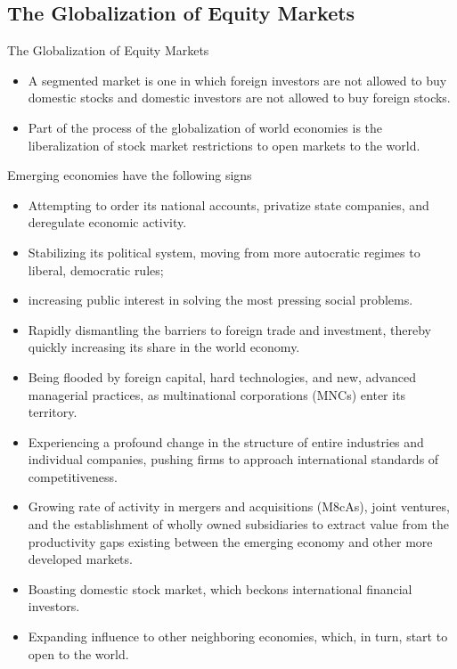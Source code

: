 \documentclass[international_finance_p2.tex]{subfiles}
\begin{document}
\subsection{The Globalization of Equity Markets}
\begin{frame}{The Globalization of Equity Markets}
\begin{itemize}[<+->]
\item
A segmented market is one in which foreign investors are not allowed to buy domestic stocks and domestic investors are not allowed to buy foreign stocks. 
\item
Part of the process of the globalization of world economies is the liberalization of stock market restrictions to open markets to the world.
\end{itemize}
\end{frame}
\begin{frame}[allowframebreaks]{Emerging economies have the following signs}
\begin{itemize}
\item
Attempting to order its national accounts, privatize state companies, and deregulate economic activity.
\item
Stabilizing its political system, moving from more autocratic regimes to liberal, democratic rules; 
\item
increasing public interest in solving the most pressing social problems.
\item
Rapidly dismantling the barriers to foreign trade and investment, thereby quickly increasing its share in the world economy. 
\item
Being flooded by foreign capital, hard technologies, and new, advanced managerial practices, as multinational corporations (MNCs) enter its territory.
\item
Experiencing a profound change in the structure of entire industries and individual companies, pushing firms to approach international standards of competitiveness.
\item
Growing rate of activity in mergers and acquisitions (M8cAs), joint ventures, and the establishment of wholly owned subsidiaries to extract value from the productivity gaps existing between the emerging economy and other more developed markets.
\item
Boasting domestic stock market, which beckons international financial investors. 
\item
Expanding influence to other neighboring economies, which, in turn, start to open to the world.
\end{itemize}
\end{frame}
\end{document}
